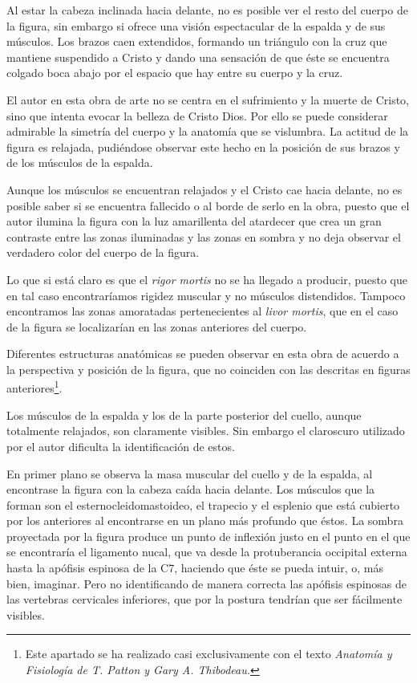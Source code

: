 Al estar la cabeza inclinada hacia delante, no es posible ver el resto del cuerpo de la figura, sin embargo si ofrece una visión espectacular de la espalda y de sus músculos. Los brazos caen extendidos, formando un triángulo con la cruz que mantiene suspendido a Cristo y dando una sensación de que éste se encuentra colgado boca abajo por el espacio que hay entre su cuerpo y la cruz.

El autor en esta obra de arte no se centra en el sufrimiento y la muerte de Cristo, sino que intenta evocar la belleza de Cristo Dios. Por ello se puede considerar admirable la simetría del cuerpo y la anatomía que se vislumbra. La actitud de la figura es relajada, pudiéndose observar este hecho en la posición de sus brazos y de los músculos de la espalda.

Aunque los músculos se encuentran relajados y el Cristo cae hacia delante, no es posible saber si se encuentra fallecido o al borde de serlo en la obra, puesto que el autor ilumina la figura con la luz amarillenta del atardecer que crea un gran contraste entre las zonas iluminadas y las zonas en sombra y no deja observar el verdadero color del cuerpo de la figura.

Lo que si está claro es que el \textit{rigor mortis} no se ha llegado a producir, puesto que en tal caso encontraríamos rigidez muscular y no músculos distendidos. Tampoco encontramos las zonas amoratadas pertenecientes al \textit{livor mortis}, que en el caso de la figura se localizarían en las zonas anteriores del cuerpo.

Diferentes estructuras anatómicas se pueden observar en esta obra de acuerdo a la perspectiva y posición de la figura, que no coinciden con las descritas en figuras anteriores\footnote{Este apartado se ha realizado casi exclusivamente con el texto \textit{Anatomía y Fisiología de T. Patton y Gary A. Thibodeau.}}.

Los músculos de la espalda y los de la parte posterior del cuello, aunque totalmente relajados, son claramente visibles. Sin embargo el claroscuro utilizado por el autor dificulta la identificación de estos.


En primer plano se observa la masa muscular del cuello y de la espalda, al encontrase la figura con la cabeza caída hacia delante. Los músculos que la forman son el esternocleidomastoideo, el trapecio y el esplenio que está cubierto por los anteriores al encontrarse en un plano más profundo que éstos. La sombra proyectada por la figura produce un punto de inflexión justo en el punto en el que se encontraría el ligamento nucal, que va desde la protuberancia occipital externa hasta la apófisis espinosa de la C7, haciendo que éste se pueda intuir, o, más bien, imaginar. Pero no identificando de manera correcta las apófisis espinosas de las vertebras cervicales inferiores, que por la postura tendrían que ser fácilmente visibles. 

